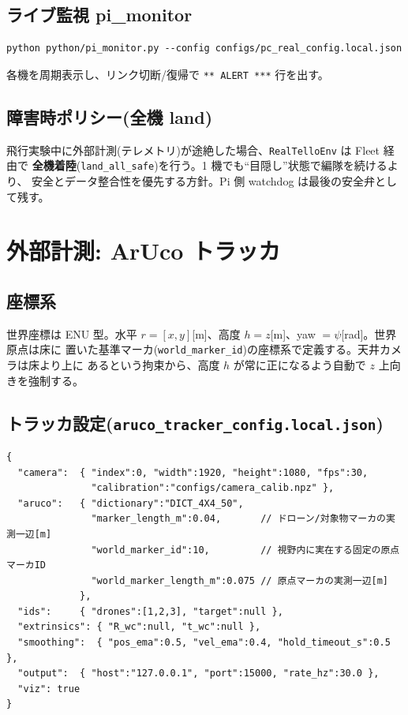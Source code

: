 \documentclass[11pt,a4paper]{ltjsarticle}
\newcommand{\code}[1]{\texttt{\small #1}}
\begin{document}
\subsection{ライブ監視 pi\_monitor}
\begin{lstlisting}
python python/pi_monitor.py --config configs/pc_real_config.local.json
\end{lstlisting}
各機を周期表示し、リンク切断/復帰で \code{*** ALERT ***} 行を出す。

\subsection{障害時ポリシー(全機 land)}
飛行実験中に外部計測(テレメトリ)が途絶した場合、\code{RealTelloEnv} は Fleet 経由で
\textbf{全機着陸}(\code{land\_all\_safe})を行う。1 機でも“目隠し”状態で編隊を続けるより、
安全とデータ整合性を優先する方針。Pi 側 watchdog は最後の安全弁として残す。

\section{外部計測: ArUco トラッカ}

\subsection{座標系}
世界座標は ENU 型。水平 $r=[x,y]$[m]、高度 $h=z$[m]、yaw $=\psi$[rad]。世界原点は床に
置いた基準マーカ(\code{world\_marker\_id})の座標系で定義する。天井カメラは床より上に
あるという拘束から、高度 $h$ が常に正になるよう自動で $z$ 上向きを強制する。

\subsection{トラッカ設定(\code{aruco\_tracker\_config.local.json})}
\begin{lstlisting}
{
  "camera":  { "index":0, "width":1920, "height":1080, "fps":30,
               "calibration":"configs/camera_calib.npz" },
  "aruco":   { "dictionary":"DICT_4X4_50",
               "marker_length_m":0.04,       // ドローン/対象物マーカの実測一辺[m]
               "world_marker_id":10,         // 視野内に実在する固定の原点マーカID
               "world_marker_length_m":0.075 // 原点マーカの実測一辺[m]
             },
  "ids":     { "drones":[1,2,3], "target":null },
  "extrinsics": { "R_wc":null, "t_wc":null },
  "smoothing":  { "pos_ema":0.5, "vel_ema":0.4, "hold_timeout_s":0.5 },
  "output":  { "host":"127.0.0.1", "port":15000, "rate_hz":30.0 },
  "viz": true
}
\end{lstlisting}
\end{document}

